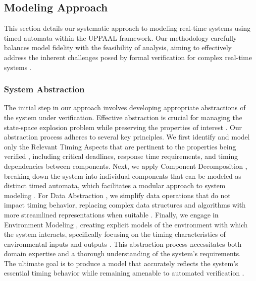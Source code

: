 
\subsection{Modeling Approach}
This section details our systematic approach to modeling real-time systems using timed automata within the UPPAAL framework. Our methodology carefully balances model fidelity with the feasibility of analysis, aiming to effectively address the inherent challenges posed by formal verification for complex real-time systems \cite{clarke2018handbook,baier2008principles}.

\subsubsection{System Abstraction}
The initial step in our approach involves developing appropriate  abstractions  of the system under verification. Effective abstraction is crucial for managing the state-space explosion problem while preserving the properties of interest \cite{clarke2007abstraction,bryant1986graph}. Our abstraction process adheres to several key principles. We first identify and model only the  Relevant Timing Aspects  that are pertinent to the properties being verified \cite{alur1994theory,kopetz2022real}, including critical deadlines, response time requirements, and timing dependencies between components. Next, we apply  Component Decomposition , breaking down the system into individual components that can be modeled as distinct timed automata, which facilitates a modular approach to system modeling \cite{larsen1997uppaal,bengtsson1996uppaal}. For  Data Abstraction , we simplify data operations that do not impact timing behavior, replacing complex data structures and algorithms with more streamlined representations when suitable \cite{clarke2007abstraction,beyer2022software}. Finally, we engage in  Environment Modeling , creating explicit models of the environment with which the system interacts, specifically focusing on the timing characteristics of environmental inputs and outputs \cite{alur2000timed,bengtsson2003timed}. This abstraction process necessitates both domain expertise and a thorough understanding of the system's requirements. The ultimate goal is to produce a model that accurately reflects the system's essential timing behavior while remaining amenable to automated verification \cite{woodcock2009formal,baier2008principles}.

